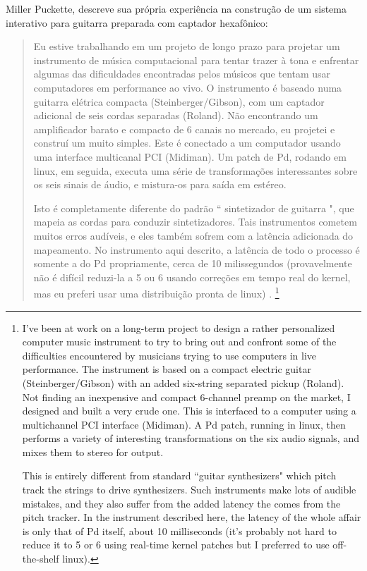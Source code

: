 \documentclass[draft]{ppgmus}
\begin{document}
 
Miller Puckette, descreve sua própria experiência na construção de um sistema interativo
para guitarra preparada com captador hexafônico:

\begin{quote}
Eu estive trabalhando em um projeto de longo prazo para projetar um
instrumento de música computacional para tentar trazer à tona e enfrentar algumas das dificuldades encontradas pelos
músicos que tentam usar computadores em performance ao vivo. O instrumento é baseado numa guitarra elétrica compacta
(Steinberger/Gibson), com um captador adicional de seis cordas separadas (Roland). Não encontrando um
amplificador barato e compacto de 6 canais no mercado, eu projetei e construí um muito simples.
Este é conectado a um computador usando uma interface multicanal PCI (Midiman). Um patch de Pd, rodando em
linux, em seguida, executa uma série de transformações interessantes sobre os seis sinais de áudio, e mistura-os
para saída em estéreo.

Isto é completamente diferente do padrão `` sintetizador de guitarra ", que mapeia as cordas para conduzir
sintetizadores. Tais instrumentos cometem muitos erros audíveis, e eles também sofrem com a latência adicionada do mapeamento. 
No instrumento aqui descrito, a latência de todo o processo é
somente a do Pd propriamente, cerca de 10 milissegundos (provavelmente não é difícil reduzi-la a 5 ou 6 usando
correções em tempo real do kernel, mas eu preferi usar uma distribuição pronta de linux) \cite{Puckette_patchfor}.
\footnote{I've been at work on a long-term project to design a rather personalized 
computer music instrument to try to bring out and confront some of the difficulties encountered by 
musicians trying to use computers in live performance. The instrument is based on a compact electric 
guitar (Steinberger/Gibson) with an added six-string separated pickup (Roland). Not finding an 
inexpensive and compact 6-channel preamp on the market, I designed and built a very crude one. 
This is interfaced to a computer using a multichannel PCI interface (Midiman). A Pd patch, running in 
linux, then performs a variety of interesting transformations on the six audio signals, and mixes them 
to stereo for output.

This is entirely different from standard ``guitar synthesizers" which pitch track the strings to drive 
synthesizers. Such instruments make lots of audible mistakes, and they also suffer from the added latency 
the comes from the pitch tracker. In the instrument described here, the latency of the whole affair is 
only that of Pd itself, about 10 milliseconds (it's probably not hard to reduce it to 5 or 6 using 
real-time kernel patches but I preferred to use off-the-shelf linux).}
\end{quote}
\end{document}
